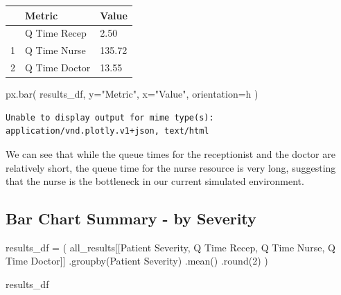 \documentclass[
  letterpaper,
  DIV=11,
  numbers=noendperiod]{scrreprt}
\newenvironment{Shaded}{}{}
\newcommand{\BuiltInTok}[1]{\textcolor[rgb]{0.84,0.23,0.29}{#1}}
\newcommand{\DecValTok}[1]{\textcolor[rgb]{0.00,0.36,0.77}{#1}}
\newcommand{\NormalTok}[1]{\textcolor[rgb]{0.14,0.16,0.18}{#1}}
\newcommand{\OperatorTok}[1]{\textcolor[rgb]{0.14,0.16,0.18}{#1}}
\newcommand{\StringTok}[1]{\textcolor[rgb]{0.01,0.18,0.38}{#1}}
\begin{document}
\begin{longtable}[]{@{}lll@{}}
\toprule\noalign{}
& Metric & Value \\
\midrule\noalign{}
\endhead
\bottomrule\noalign{}
\endlastfoot
0 & Q Time Recep & 2.50 \\
1 & Q Time Nurse & 135.72 \\
2 & Q Time Doctor & 13.55 \\
\end{longtable}

\begin{Shaded}
\begin{Highlighting}[]
\NormalTok{px.bar(}
\NormalTok{    results\_df,}
\NormalTok{    y}\OperatorTok{=}\StringTok{"Metric"}\NormalTok{,}
\NormalTok{    x}\OperatorTok{=}\StringTok{"Value"}\NormalTok{,}
\NormalTok{    orientation}\OperatorTok{=}\StringTok{\textquotesingle{}h\textquotesingle{}}
\NormalTok{    )}
\end{Highlighting}
\end{Shaded}

\begin{verbatim}
Unable to display output for mime type(s): application/vnd.plotly.v1+json, text/html
\end{verbatim}

We can see that while the queue times for the receptionist and the
doctor are relatively short, the queue time for the nurse resource is
very long, suggesting that the nurse is the bottleneck in our current
simulated environment.

\subsection{Bar Chart Summary - by
Severity}\label{bar-chart-summary---by-severity}

\begin{Shaded}
\begin{Highlighting}[]
\NormalTok{results\_df }\OperatorTok{=}\NormalTok{ (}
\NormalTok{    all\_results[[}\StringTok{\textquotesingle{}Patient Severity\textquotesingle{}}\NormalTok{, }\StringTok{\textquotesingle{}Q Time Recep\textquotesingle{}}\NormalTok{, }\StringTok{\textquotesingle{}Q Time Nurse\textquotesingle{}}\NormalTok{, }\StringTok{\textquotesingle{}Q Time Doctor\textquotesingle{}}\NormalTok{]]}
\NormalTok{    .groupby(}\StringTok{\textquotesingle{}Patient Severity\textquotesingle{}}\NormalTok{)}
\NormalTok{    .mean()}
\NormalTok{    .}\BuiltInTok{round}\NormalTok{(}\DecValTok{2}\NormalTok{)}
\NormalTok{)}

\NormalTok{results\_df}
\end{Highlighting}
\end{Shaded}
\end{document}
